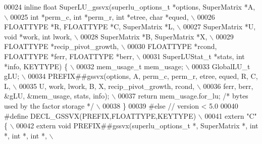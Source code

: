 \begin{DoxyCode}
00024 \textcolor{preprocessor}{    inline float SuperLU\_gssvx(superlu\_options\_t *options, SuperMatrix *A,                                \(\backslash\)}
00025 \textcolor{preprocessor}{         int *perm\_c, int *perm\_r, int *etree, char *equed,                                               \(\backslash\)}
00026 \textcolor{preprocessor}{         FLOATTYPE *R, FLOATTYPE *C, SuperMatrix *L,                                                      \(\backslash\)}
00027 \textcolor{preprocessor}{         SuperMatrix *U, void *work, int lwork,                                                           \(\backslash\)}
00028 \textcolor{preprocessor}{         SuperMatrix *B, SuperMatrix *X,                                                                  \(\backslash\)}
00029 \textcolor{preprocessor}{         FLOATTYPE *recip\_pivot\_growth,                                                                   \(\backslash\)}
00030 \textcolor{preprocessor}{         FLOATTYPE *rcond, FLOATTYPE *ferr, FLOATTYPE *berr,                                              \(\backslash\)}
00031 \textcolor{preprocessor}{         SuperLUStat\_t *stats, int *info, KEYTYPE) \{                                                      \(\backslash\)}
00032 \textcolor{preprocessor}{    mem\_usage\_t mem\_usage;                                                                                \(\backslash\)}
00033 \textcolor{preprocessor}{    GlobalLU\_t gLU;                                                                                       \(\backslash\)}
00034 \textcolor{preprocessor}{    PREFIX##gssvx(options, A, perm\_c, perm\_r, etree, equed, R, C, L,                                      \(\backslash\)}
00035 \textcolor{preprocessor}{         U, work, lwork, B, X, recip\_pivot\_growth, rcond,                                                 \(\backslash\)}
00036 \textcolor{preprocessor}{         ferr, berr, &gLU, &mem\_usage, stats, info);                                                      \(\backslash\)}
00037 \textcolor{preprocessor}{    return mem\_usage.for\_lu; }\textcolor{comment}{/* bytes used by the factor storage */}\textcolor{preprocessor}{                                       \(\backslash\)}
00038 \textcolor{preprocessor}{  \}}
00039 \textcolor{preprocessor}{#else // version < 5.0}
00040 \textcolor{preprocessor}{#define DECL\_GSSVX(PREFIX,FLOATTYPE,KEYTYPE)        \(\backslash\)}
00041 \textcolor{preprocessor}{    extern "C" \{                                                                                          \(\backslash\)}
00042 \textcolor{preprocessor}{      extern void PREFIX##gssvx(superlu\_options\_t *, SuperMatrix *, int *, int *, int *,                  \(\backslash\)}

\end{DoxyCode}
